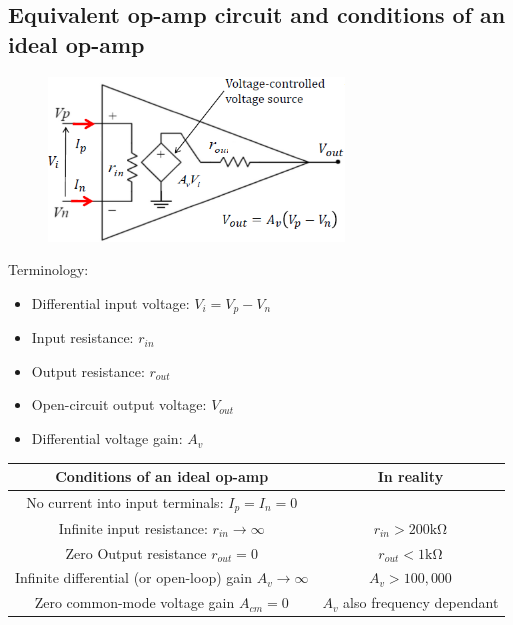 \documentclass[class=report, crop=false, 12pt,a4paper]{standalone}
\begin{document}
\subsection{Equivalent op-amp circuit and conditions of an ideal op-amp}
\begin{figure}[H]
  \centering
  \includegraphics[width = 0.7\textwidth]{../img/diagram43.png}
\end{figure}
Terminology:
\begin{itemize}
  \item Differential input voltage: $V_i = V_p - V_n$
  \item Input resistance: $r_{in}$
  \item Output resistance: $r_{out}$
  \item Open-circuit output voltage: $V_{out}$
  \item Differential voltage gain: $A_v$
\end{itemize}
\begin{center}
  \begin{tabular}{ |c|c| } 
    \hline
    \textbf{Conditions of an ideal op-amp} & \textbf{In reality} \\
    \hline
    \hline
    No current into input terminals: $I_p = I_n = 0$ & \\
    \hline
    Infinite input resistance: $r_{in} \rightarrow \infty$ & $r_{in} > 200 \si{\kilo \ohm}$\\
    \hline
    Zero Output resistance $r_{out} = 0$ & $r_{out} < 1 \si{\kilo\ohm}$\\
    \hline
    Infinite differential (or open-loop) gain $A_v \rightarrow \infty$ & $A_v > 100,000$\\
    \hline
    Zero common-mode voltage gain $A_{cm} = 0$ & $A_v$ also frequency dependant\\
    \hline
  \end{tabular}
\end{center}
\end{document}
